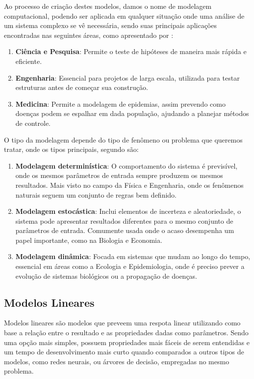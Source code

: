 \documentclass[
	12pt,				%
	openright,			%
	oneside,			%
	a4paper,			%
	english,			%
	brazil				%
	]{abntex2}
\begin{document}
Ao processo de criação destes modelos, damos o nome de modelagem computacional, podendo ser aplicada em
qualquer situação onde uma análise de um sistema complexo se vê necessária, sendo suas principais
aplicações encontradas nas seguintes áreas, como apresentado por \cite{modelagem_computacional}:

\begin{enumerate}
	\item \textbf{Ciência e Pesquisa}: Permite o teste de hipóteses de maneira mais rápida e eficiente.
	\item \textbf{Engenharia}: Essencial para projetos de larga escala, utilizada para testar estruturas antes de
	começar sua construção.
	\item \textbf{Medicina}: Permite a modelagem de epidemias, assim prevendo como doenças podem se espalhar em dada
	população, ajudando a planejar métodos de controle.
\end{enumerate}

O tipo da modelagem depende do tipo de fenômeno ou problema que queremos tratar, onde os tipos principais,
segundo \cite{modelagem_computacional} são:

\begin{enumerate}
	\item \textbf{Modelagem determinística}: O comportamento do sistema é previsível, onde os mesmos parâmetros de 
	entrada sempre produzem os mesmos resultados. Mais visto no campo da Física e Engenharia, onde os 
	fenômenos naturais seguem um conjunto de regras bem definido.
	\item \textbf{Modelagem estocástica}: Inclui elementos de incerteza e aleatoriedade, o sistema pode apresentar
	resultados diferentes para o mesmo conjunto de parâmetros de entrada. Comumente usada onde o acaso 
	desempenha um papel importante, como na Biologia e Economia.
	\item \textbf{Modelagem dinâmica}: Focada em sistemas que mudam ao longo do tempo, essencial em áreas como a
	Ecologia e Epidemiologia, onde é preciso prever a evolução de sistemas biológicos ou a propagação
	de doenças. 
\end{enumerate}

\subsection{Modelos Lineares}

Modelos lineares são modelos que preveem uma respota linear utilizando como base a relação entre o resultado
e as propriedades dadas como parâmetros. Sendo uma opção mais simples, possuem propriedades mais fáceis de
serem entendidas e um tempo de desenvolvimento mais curto quando comparados a outros tipos de modelos,
como redes neurais, ou árvores de decisão, empregadas no mesmo problema. \cite{modelos_lineares}
\end{document}
